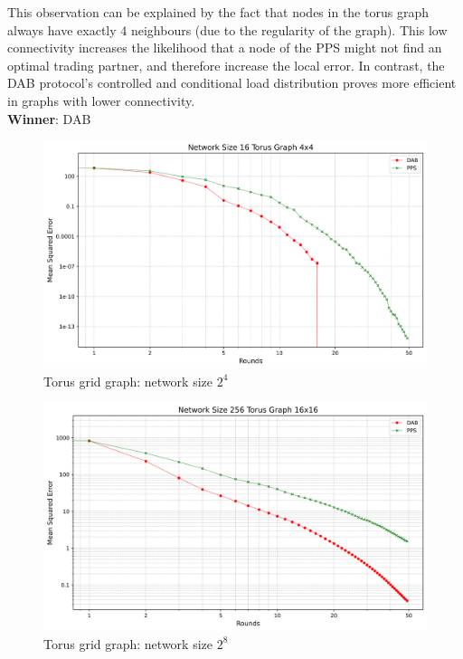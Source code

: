 This observation can be explained by the fact that nodes in the torus graph always have exactly 4 neighbours (due to the regularity of the graph). This low connectivity increases the likelihood that a node of the PPS might not find an optimal trading partner, and therefore increase the local error. In contrast, the DAB protocol's controlled and conditional load distribution proves more efficient in graphs with lower connectivity.\\
\textbf{Winner}: DAB
\begin{figure}[H]
    \centering
    \includegraphics[scale=0.5]{figures/torusGridGraphSimulations/DAB_vs_PPS_TG_r50_n16.png}
    \caption{Torus grid graph: network size $2^{4}$}
    \label{fig:16torusGraph}
\end{figure}

\begin{figure}[H]
    \centering
    \includegraphics[scale=0.5]{figures/torusGridGraphSimulations/DAB_vs_PPS_TG_r50_n256.png}
    \caption{Torus grid graph: network size $2^{8}$}
    \label{fig:256torusGraph}
\end{figure}

